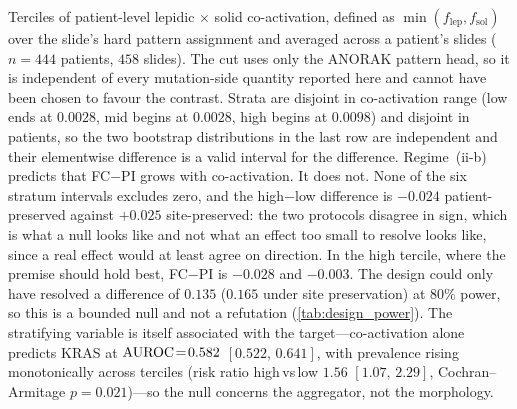 \begin{flushleft}\footnotesize
Terciles of patient-level lepidic$\,\times\,$solid co-activation, defined as
$\min(f_{\text{lep}}, f_{\text{sol}})$ over the slide's hard pattern
assignment and averaged across a patient's slides
($n\!=\!444$ patients, $458$ slides). The cut uses only the ANORAK pattern
head, so it is independent of every mutation-side quantity reported here and
cannot have been chosen to favour the contrast. Strata are disjoint in
co-activation range (low ends at $0.0028$, mid begins at $0.0028$, high begins
at $0.0098$) and disjoint in patients, so the two bootstrap distributions in
the last row are independent and their elementwise difference is a valid
interval for the difference.
Regime~(ii-b) predicts that FC${-}$PI grows with co-activation. It does not.
None of the six stratum intervals excludes zero, and the high${-}$low
difference is $-0.024$ patient-preserved against ${+}0.025$ site-preserved:
the two protocols disagree in sign, which is what a null looks like and not
what an effect too small to resolve looks like, since a real effect would at
least agree on direction. In the high tercile, where the premise should hold
best, FC${-}$PI is $-0.028$ and $-0.003$. The design could only have
resolved a difference of $0.135$ ($0.165$ under site preservation) at
$80\%$ power, so this is a bounded null and not a refutation
(\cref{tab:design_power}).
The stratifying variable is itself associated with the target---co-activation
alone predicts KRAS at $\text{AUROC}\!=\!0.582$ $[0.522,\,0.641]$, with prevalence
rising monotonically across terciles (risk ratio high\,vs\,low $1.56$
$[1.07,\,2.29]$, Cochran--Armitage $p\!=\!0.021$)---so the null concerns the
aggregator, not the morphology.
\end{flushleft}
